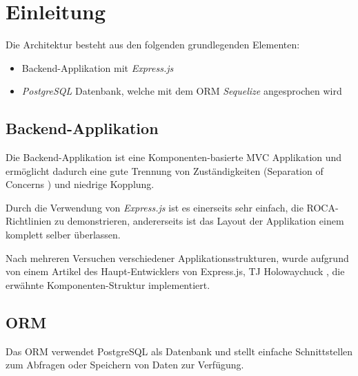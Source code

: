 \section{Einleitung}

Die Architektur besteht aus den folgenden grundlegenden Elementen:
\begin{itemize}
	\item Backend-Applikation mit \emph{Express.js} \cite{Expressjs}
	\item \emph{PostgreSQL} \cite{PostgreSQL} Datenbank, welche mit dem \gls{ORM}
		\emph{Sequelize} \cite{Sequelize} angesprochen wird
\end{itemize}

\subsection{Backend-Applikation}

Die Backend-Applikation ist eine Komponenten-basierte MVC Applikation und
ermöglicht dadurch eine gute Trennung von Zuständigkeiten (Separation of
Concerns \cite{SeparationOfConcerns}) und niedrige Kopplung.

Durch die Verwendung von \emph{Express.js} \cite{Expressjs} ist es einerseits
sehr einfach, die ROCA-Richtlinien zu demonstrieren, andererseits ist das Layout
der Applikation einem komplett selber überlassen.

Nach mehreren Versuchen verschiedener Applikationsstrukturen, wurde
aufgrund von einem Artikel \cite{TJH_ComponentStructure} des Haupt-Entwicklers
von Express.js, TJ Holowaychuck \cite{TJH}, die erwähnte Komponenten-Struktur
implementiert.




\subsection{ORM}

Das \gls{ORM} verwendet PostgreSQL \cite{PostgreSQL} als Datenbank und stellt
einfache Schnittstellen zum Abfragen oder Speichern von Daten zur Verfügung.